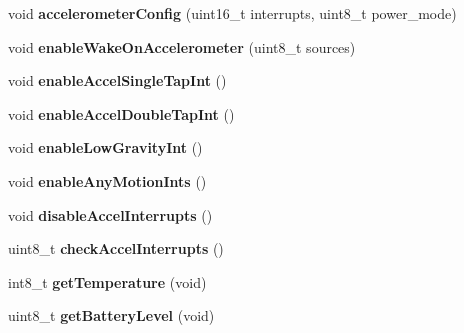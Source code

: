 \begin{DoxyCompactItemize}
\item 
\hypertarget{class_bean_class_a118526842dd8cbf820ba34e83d706033}{}void {\bfseries accelerometer\+Config} (uint16\+\_\+t interrupts, uint8\+\_\+t power\+\_\+mode)\label{class_bean_class_a118526842dd8cbf820ba34e83d706033}

\item 
\hypertarget{class_bean_class_a6fc48e30999657b04b27908fc4f1bf24}{}void {\bfseries enable\+Wake\+On\+Accelerometer} (uint8\+\_\+t sources)\label{class_bean_class_a6fc48e30999657b04b27908fc4f1bf24}

\item 
\hypertarget{class_bean_class_a1e4331d3c2edb2947fa854c4dff67a31}{}void {\bfseries enable\+Accel\+Single\+Tap\+Int} ()\label{class_bean_class_a1e4331d3c2edb2947fa854c4dff67a31}

\item 
\hypertarget{class_bean_class_ad1bbfff9e342034011262d29c55da20a}{}void {\bfseries enable\+Accel\+Double\+Tap\+Int} ()\label{class_bean_class_ad1bbfff9e342034011262d29c55da20a}

\item 
\hypertarget{class_bean_class_a3d270c9ad8119d000fee538a25020cd0}{}void {\bfseries enable\+Low\+Gravity\+Int} ()\label{class_bean_class_a3d270c9ad8119d000fee538a25020cd0}

\item 
\hypertarget{class_bean_class_a4b0568e0ef49e4f29b733649370c35a7}{}void {\bfseries enable\+Any\+Motion\+Ints} ()\label{class_bean_class_a4b0568e0ef49e4f29b733649370c35a7}

\item 
\hypertarget{class_bean_class_adbe18e0b7c9505cb3ba8be0a78203738}{}void {\bfseries disable\+Accel\+Interrupts} ()\label{class_bean_class_adbe18e0b7c9505cb3ba8be0a78203738}

\item 
\hypertarget{class_bean_class_aaa0bac4371fd7f49671f06f6373242be}{}uint8\+\_\+t {\bfseries check\+Accel\+Interrupts} ()\label{class_bean_class_aaa0bac4371fd7f49671f06f6373242be}

\item 
\hypertarget{class_bean_class_a711e837c145b51a8e95aa22a3fc9bcf9}{}int8\+\_\+t {\bfseries get\+Temperature} (void)\label{class_bean_class_a711e837c145b51a8e95aa22a3fc9bcf9}

\item 
\hypertarget{class_bean_class_ac21fd79279f5e25c37609ff15e53cea1}{}uint8\+\_\+t {\bfseries get\+Battery\+Level} (void)\label{class_bean_class_ac21fd79279f5e25c37609ff15e53cea1}


\end{DoxyCompactItemize}
